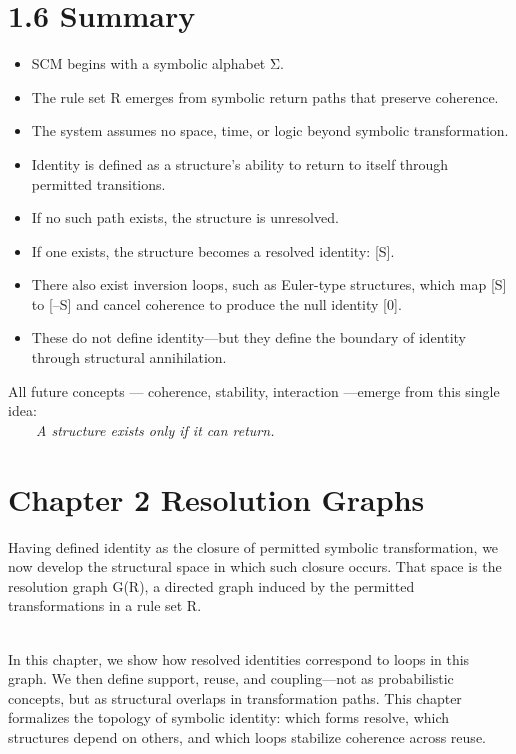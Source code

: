 \section{1.6 \textbar{} Summary}\label{summary}

\begin{itemize}
\item
  SCM begins with a symbolic alphabet Σ.
\item
  The rule set R emerges from symbolic return paths that preserve
  coherence.
\item
  The system assumes no space, time, or logic beyond symbolic
  transformation.
\item
  Identity is defined as a structure's ability to return to itself
  through permitted transitions.
\item
  If no such path exists, the structure is unresolved.
\item
  If one exists, the structure becomes a resolved identity: {[}S{]}.
\item
  There also exist inversion loops, such as Euler-type structures, which
  map {[}S{]} to {[}--S{]} and cancel coherence to produce the null
  identity {[}0{]}.
\item
  These do not define identity---but they define the boundary of
  identity through structural annihilation.
\end{itemize}

All future concepts --- coherence, stability, interaction ---emerge from
this single idea:\\
  \emph{A structure exists only if it can return.}

\section{Chapter 2 \textbar{} Resolution
Graphs}\label{chapter-2-resolution-graphs}

Having defined identity as the closure of permitted symbolic
transformation, we now develop the structural space in which such
closure occurs. That space is the resolution graph G(R), a directed
graph induced by the permitted transformations in a rule set R.\\
\strut \\
In this chapter, we show how resolved identities correspond to loops in
this graph. We then define support, reuse, and coupling---not as
probabilistic concepts, but as structural overlaps in transformation
paths. This chapter formalizes the topology of symbolic identity: which
forms resolve, which structures depend on others, and which loops
stabilize coherence across reuse.

